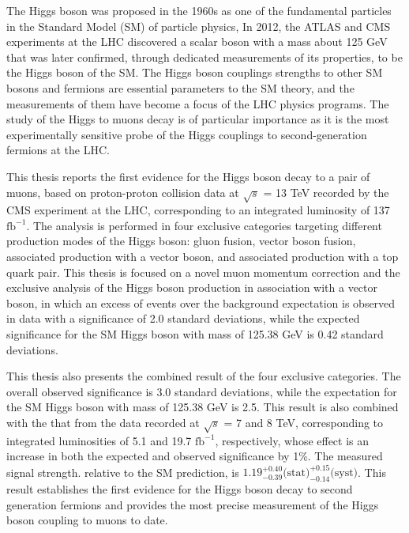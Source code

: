 \justify

\hspace{2em} The Higgs boson was proposed in the 1960s as one of the fundamental particles in the Standard Model (SM) of particle physics,
In 2012, the ATLAS and CMS experiments at the LHC discovered a scalar boson with a mass about 125 GeV 
that was later confirmed, through dedicated measurements of its properties, to be the Higgs boson of the SM.
The Higgs boson couplings strengths to other SM bosons and fermions are essential parameters to the SM theory,
and the measurements of them have become a focus of the LHC physics programs.
The study of the Higgs to muons decay is of particular importance 
as it is the most experimentally sensitive probe of the Higgs couplings to second-generation fermions at the LHC.

This thesis reports the first evidence for the Higgs boson decay to a pair of muons,
based on proton-proton collision data at $\sqrt{s}$ = 13 TeV recorded by the CMS experiment at the LHC, 
corresponding to an integrated luminosity of 137 $\text{fb}^{-1}$.
The analysis is performed in four exclusive categories targeting different production modes of the Higgs boson:
gluon fusion, vector boson fusion, associated production with a vector boson, and associated production with a top quark pair.
This thesis is focused on a novel muon momentum correction and the exclusive analysis of the Higgs boson production in association with a vector boson,
in which an excess of events over the background expectation is observed in data with a significance of 2.0 standard deviations,
while the expected significance for the SM Higgs boson with mass of 125.38 GeV is 0.42 standard deviations.

This thesis also presents the combined result of the four exclusive categories. 
The overall observed significance is 3.0 standard deviations, 
while the expectation for the SM Higgs boson with mass of 125.38 GeV is 2.5.
This result is also combined with the that from the data recorded at $\sqrt{s}$ = 7 and 8 TeV, 
corresponding to integrated luminosities of 5.1 and 19.7 $\text{fb}^{-1}$, respectively,
whose effect is an increase in both the expected and observed significance by 1\%.
The measured signal strength. relative to the SM prediction, is $1.19^{+0.40}_{-0.39} \text{(stat)}^{+0.15}_{-0.14} \text{(syst)}$.
This result establishes the first evidence for the Higgs boson decay to second generation fermions
and provides the most precise measurement of the Higgs boson coupling to muons to date.
